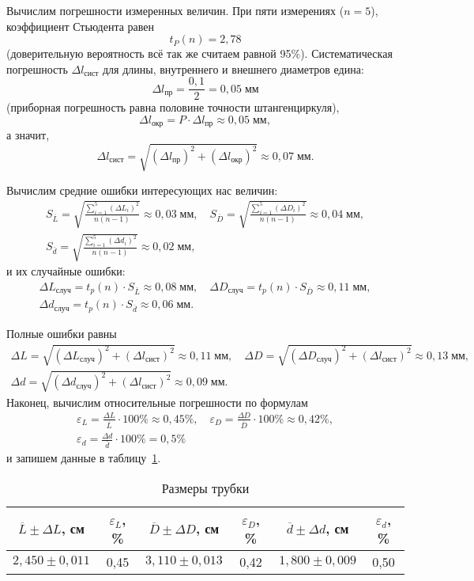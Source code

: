 Вычислим погрешности измеренных величин. При пяти измерениях ($n=5$), коэффициент Стьюдента равен
\[
t_P(n)=2{,}78
\]
(доверительную вероятность всё так же считаем равной 95\%). Систематическая погрешность $\Delta l_\text{сист}$ для длины, внутреннего и внешнего диаметров едина:
\[
\Delta l_\text{пр}=\frac{0{,}1}{2}=0{,}05\;\text{мм}
\]
(приборная погрешность равна половине точности штангенциркуля),
\[
\Delta l_\text{окр}=P\cdot\Delta l_\text{пр}\approx0{,}05\;\text{мм},
\]
а значит,
\[
\Delta l_\text{сист}=\sqrt{(\Delta l_\text{пр})^2+(\Delta l_\text{окр})^2}\approx0{,}07\;\text{мм}.
\]

Вычислим средние ошибки интересующих нас величин:
\begin{gather*}
S_{\overline L}=\sqrt{\frac{\sum\limits_{i=1}^5(\Delta L_i)^2}{n(n-1)}}\approx0{,}03\;\text{мм},\quad S_{\overline D}=\sqrt{\frac{\sum\limits_{i=1}^5(\Delta D_i)^2}{n(n-1)}}\approx0{,}04\;\text{мм}, \\
S_{\bar d}=\sqrt{\frac{\sum\limits_{i=1}^5(\Delta d_i)^2}{n(n-1)}}\approx0{,}02\;\text{мм},
\end{gather*}
и их случайные ошибки:
\begin{gather*}
\Delta L_\text{случ}=t_p(n)\cdot S_{\overline L}\approx0{,}08\;\text{мм},\quad\Delta D_\text{случ}=t_p(n)\cdot S_{\overline D}\approx0{,}11\;\text{мм}, \\
\Delta d_\text{случ}=t_p(n)\cdot S_{\overline d}\approx0{,}06\;\text{мм}.
\end{gather*}

Полные ошибки равны
\begin{gather*}
\Delta L=\sqrt{(\Delta L_\text{случ})^2+(\Delta l_\text{сист})^2}\approx0{,}11\;\text{мм},\quad\Delta D=\sqrt{(\Delta D_\text{случ})^2+(\Delta l_\text{сист})^2}\approx0{,}13\;\text{мм}, \\
\Delta d=\sqrt{(\Delta d_\text{случ})^2+(\Delta l_\text{сист})^2}\approx0{,}09\;\text{мм}.
\end{gather*}
Наконец, вычислим относительные погрешности по формулам
\begin{gather*}
\varepsilon_L=\frac{\Delta L}{\overline L}\cdot100\%\approx0{,}45\%,\quad\varepsilon_D=\frac{\Delta D}{\overline D}\cdot100\%\approx0{,}42\%, \\
\varepsilon_d=\frac{\Delta d}{\overline d}\cdot100\%=0{,}5\%
\end{gather*}
и запишем данные в таблицу~\ref{TabThree}.

\begin{table}[h]
	\begin{center}
		\begin{tabular}{|c|c|c|c|c|c|}
		\hline
		 \parbox[c][1.7em]{5em}{$\overline L\pm\Delta L$, см} & $\varepsilon_L$, \% & $\overline D\pm\Delta D$, см & $\varepsilon_D$, \% & $\overline d\pm\Delta d$, см & $\varepsilon_d$, \% \\
		\hline
		$2{,}450\pm0{,}011$ & 0{,}45 & $3{,}110\pm0{,}013$ & 0{,}42 & $1{,}800\pm0{,}009$ & 0{,}50 \\
		\hline
		\end{tabular}
	\caption{Размеры трубки}\label{TabThree}
	\end{center}
\end{table}

